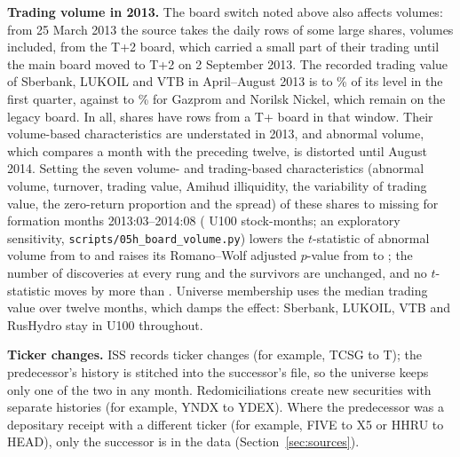 \documentclass[11pt]{article}
\newcommand{\RW}{Romano--Wolf}
\begin{document}
\textbf{Trading volume in 2013.} The board switch noted above also affects volumes: from 25 March 2013 the source takes
the daily rows of some large shares, volumes included, from the T+2 board, which carried a small part of their trading
until the main board moved to T+2 on 2 September 2013. The recorded trading value of Sberbank, LUKOIL and VTB in
April--August 2013 is  to \% of its level in the first quarter, against
 to \% for Gazprom and Norilsk Nickel, which remain on the legacy board.
In all,  shares have rows from a T+ board in that window. Their volume-based characteristics are understated in 2013, and abnormal volume, which compares a month
with the preceding twelve, is distorted until August 2014. Setting the seven volume- and trading-based characteristics
(abnormal volume, turnover, trading value, Amihud illiquidity, the variability of trading value, the zero-return
proportion and the spread) of these shares to missing for formation months 2013:03--2014:08 (
U100 stock-months; an exploratory sensitivity, \texttt{scripts/05h\_board\_volume.py}) lowers the $t$-statistic of
abnormal volume from  to  and raises its \RW{} adjusted $p$-value from  to
; the number of discoveries at every rung and the survivors are unchanged, and no $t$-statistic
moves by more than . Universe membership uses the median trading value over twelve months, which damps
the effect: Sberbank, LUKOIL, VTB and RusHydro stay in U100 throughout.

\textbf{Ticker changes.} ISS records ticker changes (for example, TCSG to T); the predecessor's history is stitched into
the successor's file, so the universe keeps only one of the two in any month. Redomiciliations create new securities
with separate histories (for example, YNDX to YDEX). Where the predecessor was a depositary receipt with a different
ticker (for example, FIVE to X5 or HHRU to HEAD), only the successor is in the data (Section~\ref{sec:sources}).
\end{document}

